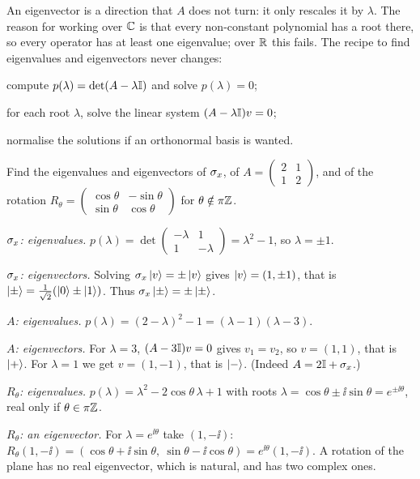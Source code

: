 An eigenvector is a direction that $A$ does not turn: it only rescales it by $\lambda$. The reason for working over $\mathbb{C}$ is that every non-constant polynomial has a root there, so every operator has at least one eigenvalue; over $\mathbb{R}$ this fails. The recipe to find eigenvalues and eigenvectors never changes:
\begin{steps}
  \item compute $p(\lambda)=\det(A-\lambda\mathbb{I})$ and solve $p(\lambda)=0$;
  \item for each root $\lambda$, solve the linear system $(A-\lambda\mathbb{I})v=0$;
  \item normalise the solutions if an orthonormal basis is wanted.
\end{steps}

\begin{example}\label{ex:eigen}
  Find the eigenvalues and eigenvectors of $\sigma_x$, of $A=\begin{pmatrix}2&1\\1&2\end{pmatrix}$, and of the rotation $R_\theta=\begin{pmatrix}\cos\theta&-\sin\theta\\\sin\theta&\cos\theta\end{pmatrix}$ for $\theta\notin\pi\mathbb{Z}$.
\end{example}
\begin{solution}
  \begin{steps}
    \item \emph{$\sigma_x$: eigenvalues.} $p(\lambda)=\det\begin{pmatrix}-\lambda&1\\1&-\lambda\end{pmatrix}=\lambda^2-1$, so $\lambda=\pm1$.
    \item \emph{$\sigma_x$: eigenvectors.} Solving $\sigma_x\left|v\right\rangle=\pm\left|v\right\rangle$ gives $\left|v\right\rangle=(1,\pm1)$, that is $\left|\pm\right\rangle=\frac1{\sqrt2}(\left|0\right\rangle\pm\left|1\right\rangle)$. Thus $\sigma_x\left|\pm\right\rangle=\pm\left|\pm\right\rangle$.
    \item \emph{$A$: eigenvalues.} $p(\lambda)=(2-\lambda)^2-1=(\lambda-1)(\lambda-3)$.
    \item \emph{$A$: eigenvectors.} For $\lambda=3$, $(A-3\mathbb{I})v=0$ gives $v_1=v_2$, so $v=(1,1)$, that is $\left|+\right\rangle$. For $\lambda=1$ we get $v=(1,-1)$, that is $\left|-\right\rangle$. (Indeed $A=2\mathbb{I}+\sigma_x$.)
    \item \emph{$R_\theta$: eigenvalues.} $p(\lambda)=\lambda^2-2\cos\theta\,\lambda+1$ with roots $\lambda=\cos\theta\pm\ii\sin\theta=e^{\pm\ii\theta}$, real only if $\theta\in\pi\mathbb{Z}$.
    \item \emph{$R_\theta$: an eigenvector.} For $\lambda=e^{\ii\theta}$ take $(1,-\ii)$: $R_\theta(1,-\ii)=(\cos\theta+\ii\sin\theta,\ \sin\theta-\ii\cos\theta)=e^{\ii\theta}(1,-\ii)$. A rotation of the plane has no real eigenvector, which is natural, and has two complex ones.
  \end{steps}
\end{solution}

